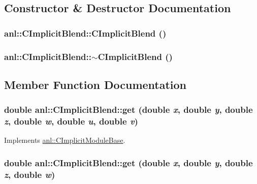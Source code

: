 \subsection{Constructor \& Destructor Documentation}
\hypertarget{classanl_1_1CImplicitBlend_a930f26a45156be0e9c07e6cb05109cb7}{
\subsubsection[{CImplicitBlend}]{\setlength{\rightskip}{0pt plus 5cm}anl::CImplicitBlend::CImplicitBlend ()}}
\label{classanl_1_1CImplicitBlend_a930f26a45156be0e9c07e6cb05109cb7}
\hypertarget{classanl_1_1CImplicitBlend_a1a0fb69088bc30effa5ffc64c1b57b16}{
\subsubsection[{$\sim$CImplicitBlend}]{\setlength{\rightskip}{0pt plus 5cm}anl::CImplicitBlend::$\sim$CImplicitBlend ()}}
\label{classanl_1_1CImplicitBlend_a1a0fb69088bc30effa5ffc64c1b57b16}


\subsection{Member Function Documentation}
\hypertarget{classanl_1_1CImplicitBlend_a9d40ee4d97dac37b2a6aea498c7b7418}{
\subsubsection[{get}]{\setlength{\rightskip}{0pt plus 5cm}double anl::CImplicitBlend::get (double {\em x}, \/  double {\em y}, \/  double {\em z}, \/  double {\em w}, \/  double {\em u}, \/  double {\em v})}}
\label{classanl_1_1CImplicitBlend_a9d40ee4d97dac37b2a6aea498c7b7418}


Implements \hyperlink{classanl_1_1CImplicitModuleBase_aa40b7d54572197612a4fea44b63447eb}{anl::CImplicitModuleBase}.\hypertarget{classanl_1_1CImplicitBlend_ac3d285ae9ab47e299c706b2357e3b179}{
\subsubsection[{get}]{\setlength{\rightskip}{0pt plus 5cm}double anl::CImplicitBlend::get (double {\em x}, \/  double {\em y}, \/  double {\em z}, \/  double {\em w})}}
\label{classanl_1_1CImplicitBlend_ac3d285ae9ab47e299c706b2357e3b179}


